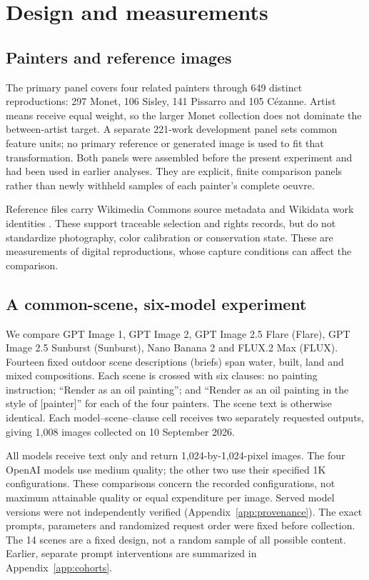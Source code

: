 \documentclass[11pt]{article}
\begin{document}
\section{Design and measurements}\label{sec:design}
\subsection{Painters and reference images}
The primary panel covers four related painters through 649 distinct reproductions: 297 Monet,
106 Sisley, 141 Pissarro and 105 C\'ezanne. Artist means receive equal weight,
so the larger Monet collection does not dominate the between-artist target.
A separate 221-work development panel sets common feature units; no primary
reference or generated image is used to fit that transformation. Both panels
were assembled before the present experiment and had been used in earlier
analyses. They are explicit, finite comparison panels rather than newly withheld
samples of each painter's complete oeuvre.

Reference files carry Wikimedia Commons source metadata and Wikidata work
identities \citep{commonsglam,vrandecic2014wikidata}. These support traceable
selection and rights records, but do not standardize photography, color
calibration or conservation state. These are measurements of digital
reproductions, whose capture conditions can affect the comparison.

\subsection{A common-scene, six-model experiment}
We compare GPT Image 1, GPT Image 2, GPT Image 2.5 Flare (Flare),
GPT Image 2.5 Sunburst (Sunburst), Nano Banana 2 and FLUX.2 Max (FLUX).
Fourteen fixed outdoor scene descriptions (briefs) span water,
built, land and mixed compositions. Each scene is crossed with six clauses:
no painting instruction; ``Render as an oil painting''; and ``Render as an oil
painting in the style of [painter]'' for each of the four painters. The scene
text is otherwise identical. Each model--scene--clause cell receives two
separately requested outputs, giving 1,008 images collected on 10 September 2026.

All models receive text only and return 1,024-by-1,024-pixel images.
The four OpenAI models use medium quality; the other two use
their specified 1K configurations. These comparisons concern the recorded
configurations, not maximum attainable quality or equal expenditure per image.
Served model versions were not independently verified
(Appendix~\ref{app:provenance}).
The exact prompts, parameters and randomized request order were fixed before
collection. The 14 scenes are a fixed design,
not a random sample of all possible content.
Earlier, separate prompt interventions are summarized in Appendix~\ref{app:cohorts}.
\end{document}
